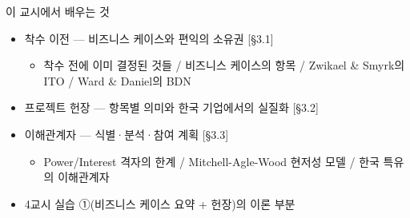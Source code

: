 \begin{frame}[allowframebreaks=1.0]{이 교시에서 배우는 것}
\small
\begin{itemize}
\item\relax 착수 이전 — 비즈니스 케이스와 편익의 소유권 [§3.1]
\par\nobreak
\begin{itemize}
\item\relax 착수 전에 이미 결정된 것들 / 비즈니스 케이스의 항목 / Zwikael \& Smyrk의 ITO / Ward \& Daniel의 BDN
\end{itemize}
\item\relax 프로젝트 헌장 — 항목별 의미와 한국 기업에서의 실질화 [§3.2]
\item\relax 이해관계자 — 식별·분석·참여 계획 [§3.3]
\par\nobreak
\begin{itemize}
\item\relax Power/Interest 격자의 한계 / Mitchell-Agle-Wood 현저성 모델 / 한국 특유의 이해관계자
\end{itemize}
\item\relax 4교시 실습 ①(비즈니스 케이스 요약 + 헌장)의 이론 부분
\end{itemize}
\end{frame}

